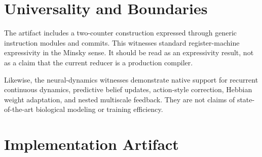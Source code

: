\documentclass[11pt]{article}
\begin{document}
\section{Universality and Boundaries}

The artifact includes a two-counter construction expressed through generic
instruction modules and commits. This witnesses standard register-machine
expressivity in the Minsky sense. It should be read as an expressivity result,
not as a claim that the current reducer is a production compiler.

Likewise, the neural-dynamics witnesses demonstrate native support for recurrent
continuous dynamics, predictive belief updates, action-style correction, Hebbian
weight adaptation, and nested multiscale feedback. They are not claims of
state-of-the-art biological modeling or training efficiency.

\section{Implementation Artifact}
\end{document}

